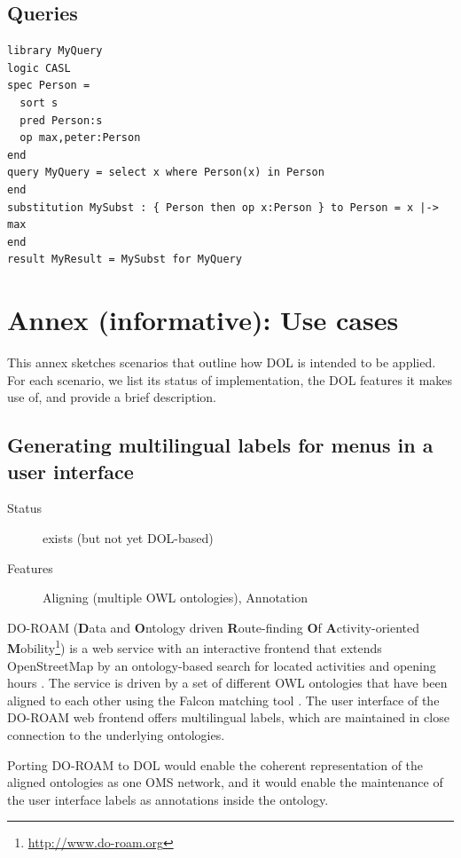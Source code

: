 \documentclass[10pt,fleqn,%
\ifpretendfinal
final%
\else
draft%
\fi,
]{scrreprt}
\newcommand{\sclause}[1]{\section{#1}}
\newcommand{\infannex}[1]{ \chapter{Annex (informative): #1} }
\begin{document}
\sclause{Queries}
\begin{lstlisting}[basicstyle=\ttfamily,language=dolText,morekeywords={props,ObjectProperty,Class,DisjointUnionOf,SubClassOf,Characteristics,Transitive,Asymmetric,SubPropertyOf,DisjointClasses,EquivalentTo,inverse,only,forall,iff,if,or,exists,query,select,where,in,substitution,result,for,along,library,spec,sort,pred,op},escapechar=@,mathescape]
library MyQuery
logic CASL
spec Person =
  sort s
  pred Person:s 
  op max,peter:Person
end
query MyQuery = select x where Person(x) in Person
end
substitution MySubst : { Person then op x:Person } to Person = x |-> max
end
result MyResult = MySubst for MyQuery
\end{lstlisting}

\infannex{Use cases}\label{a:use-cases}

This annex sketches scenarios that outline how DOL is intended to be applied.  For each scenario, we list its status of implementation, the DOL features it makes use of, and provide a brief description.

\newenvironment{usecase}[3]{\sclause{#1}%
\begin{description}
\item[Status] #2
\item[Features] #3
\end{description}
}{}
\begin{usecase}{Generating multilingual labels for menus in a user interface}{exists (but not yet DOL-based)}{Aligning (multiple OWL ontologies), Annotation}
  DO-ROAM (\textbf{D}ata and \textbf{O}ntology driven \textbf{R}oute-finding \textbf{O}f \textbf{A}ctivity-oriented \textbf{M}obility\footnote{\url{http://www.do-roam.org}}) is a web service with an interactive frontend that extends OpenStreetMap by an ontology-based search for located activities and opening hours \cite{do-roam}.  The service is driven by a set of different OWL ontologies that have been aligned to each other using the Falcon matching tool \cite{HuQu-08}.  The user interface of the DO-ROAM web frontend offers multilingual labels, which are maintained in close connection to the underlying ontologies.

  Porting DO-ROAM to DOL would enable the coherent representation of the aligned ontologies as one OMS network, and it would enable  the maintenance of the user interface labels as annotations inside the ontology.
\end{usecase}
\end{document}
